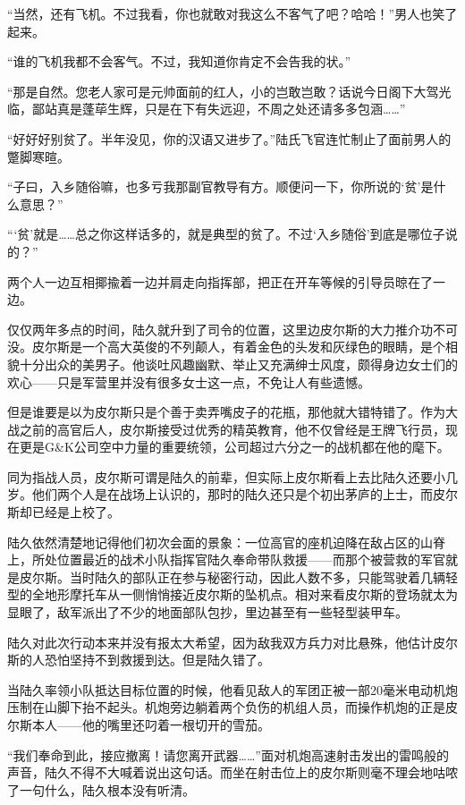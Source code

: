 “当然，还有飞机。不过我看，你也就敢对我这么不客气了吧？哈哈！”男人也笑了起来。

“谁的飞机我都不会客气。不过，我知道你肯定不会告我的状。”

“那是自然。您老人家可是元帅面前的红人，小的岂敢岂敢？话说今日阁下大驾光临，鄙站真是蓬荜生辉，只是在下有失远迎，不周之处还请多多包涵……”

“好好好别贫了。半年没见，你的汉语又进步了。”陆氏飞官连忙制止了面前男人的蹩脚寒暄。

“子曰，入乡随俗嘛，也多亏我那副官教导有方。顺便问一下，你所说的‘贫’是什么意思？”

“‘贫’就是……总之你这样话多的，就是典型的贫了。不过‘入乡随俗’到底是哪位子说的？”

两个人一边互相揶揄着一边并肩走向指挥部，把正在开车等候的引导员晾在了一边。

仅仅两年多点的时间，陆久就升到了司令的位置，这里边皮尔斯的大力推介功不可没。皮尔斯是一个高大英俊的不列颠人，有着金色的头发和灰绿色的眼睛，是个相貌十分出众的美男子。他谈吐风趣幽默、举止又充满绅士风度，颇得身边女士们的欢心——只是军营里并没有很多女士这一点，不免让人有些遗憾。

但是谁要是以为皮尔斯只是个善于卖弄嘴皮子的花瓶，那他就大错特错了。作为大战之前的高官后人，皮尔斯接受过优秀的精英教育，他不仅曾经是王牌飞行员，现在更是G\&K公司空中力量的重要统领，公司超过六分之一的战机都在他的麾下。
                                 
同为指战人员，皮尔斯可谓是陆久的前辈，但实际上皮尔斯看上去比陆久还要小几岁。他们两个人是在战场上认识的，那时的陆久还只是个初出茅庐的上士，而皮尔斯却已经是上校了。

陆久依然清楚地记得他们初次会面的景象：一位高官的座机迫降在敌占区的山脊上，所处位置最近的战术小队指挥官陆久奉命带队救援——而那个被营救的军官就是皮尔斯。当时陆久的部队正在参与秘密行动，因此人数不多，只能驾驶着几辆轻型的全地形摩托车从一侧悄悄接近皮尔斯的坠机点。相对来看皮尔斯的登场就太为显眼了，敌军派出了不少的地面部队包抄，里边甚至有一些轻型装甲车。

陆久对此次行动本来并没有报太大希望，因为敌我双方兵力对比悬殊，他估计皮尔斯的人恐怕坚持不到救援到达。但是陆久错了。

当陆久率领小队抵达目标位置的时候，他看见敌人的军团正被一部20毫米电动机炮压制在山脚下抬不起头。机炮旁边躺着两个负伤的机组人员，而操作机炮的正是皮尔斯本人——他的嘴里还叼着一根切开的雪茄。

“我们奉命到此，接应撤离！请您离开武器……”面对机炮高速射击发出的雷鸣般的声音，陆久不得不大喊着说出这句话。而坐在射击位上的皮尔斯则毫不理会地咕哝了一句什么，陆久根本没有听清。


